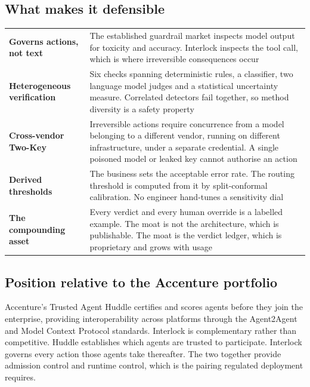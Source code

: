 \documentclass[10pt]{article}
\begin{document}
\subsection{What makes it defensible}

\vspace{2pt}
{\small
\begin{xltabular}{\textwidth}{@{}L{0.24\textwidth}Y@{}}
\toprule
{} &  \\
\midrule
\textbf{Governs actions, not text} & The established guardrail market inspects model output for toxicity and accuracy. Interlock inspects the tool call, which is where irreversible consequences occur \\
\textbf{Heterogeneous verification} & Six checks spanning deterministic rules, a classifier, two language model judges and a statistical uncertainty measure. Correlated detectors fail together, so method diversity is a safety property \\
\textbf{Cross-vendor Two-Key} & Irreversible actions require concurrence from a model belonging to a different vendor, running on different infrastructure, under a separate credential. A single poisoned model or leaked key cannot authorise an action \\
\textbf{Derived thresholds} & The business sets the acceptable error rate. The routing threshold is computed from it by split-conformal calibration. No engineer hand-tunes a sensitivity dial \\
\textbf{The compounding asset} & Every verdict and every human override is a labelled example. The moat is not the architecture, which is publishable. The moat is the verdict ledger, which is proprietary and grows with usage \\
\bottomrule
\end{xltabular}}

\subsection{Position relative to the Accenture portfolio}

Accenture's Trusted Agent Huddle certifies and scores agents before they join the
enterprise, providing interoperability across platforms through the Agent2Agent and Model
Context Protocol standards. Interlock is complementary rather than competitive. Huddle
establishes which agents are trusted to participate. Interlock governs every action those
agents take thereafter. The two together provide admission control and runtime control,
which is the pairing regulated deployment requires.
\end{document}
